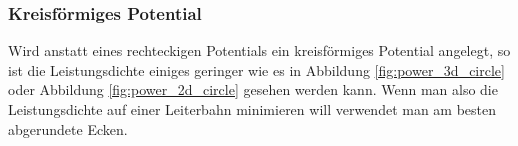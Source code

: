 \subsubsection{Kreisförmiges Potential}
Wird anstatt eines rechteckigen Potentials ein kreisförmiges Potential angelegt, so ist die Leistungsdichte einiges geringer wie es in Abbildung \ref{fig:power_3d_circle} oder Abbildung \ref{fig:power_2d_circle} gesehen werden kann. Wenn man also die Leistungsdichte auf einer Leiterbahn minimieren will verwendet man am besten abgerundete Ecken.

%	
%	
%	

